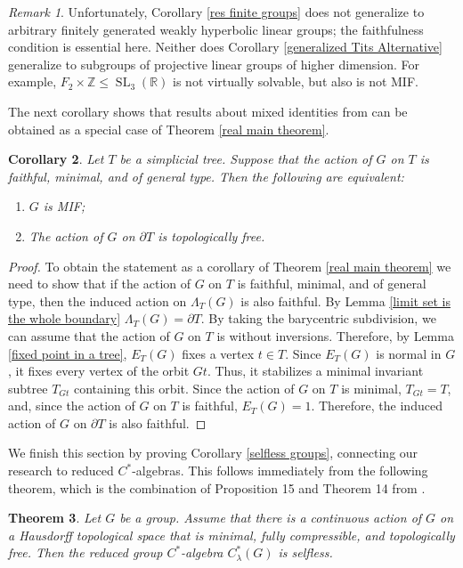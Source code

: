 \documentclass[11pt,letterpaper]{article}
\newcommand{\ZZ}{\mathbb{Z}}
\newcommand{\RR}{\mathbb{R}}
\DeclareMathOperator{\SL}{SL}
\newtheorem{thm}{Theorem}[section]
\newtheorem{cor}[thm]{Corollary}
\theoremstyle{definition}
\theoremstyle{remark}
\newtheorem{rem}[thm]{Remark}
\begin{document}
\begin{rem}
Unfortunately, Corollary \ref{res finite groups} does not generalize to arbitrary finitely generated weakly hyperbolic linear groups; the faithfulness condition is essential here. Neither does Corollary \ref{generalized Tits Alternative} generalize to subgroups of projective linear groups of higher dimension. For example, $F_2 \times \ZZ \leq \SL_3(\RR)$ is not virtually solvable, but also is not MIF. 
\end{rem}

The next corollary shows that results about mixed identities from \cite{FMMS} can be obtained as a special case of Theorem \ref{real main theorem}.

\begin{cor}\cite[Theorem B]{FMMS}\label{previous results about MIF in trees}
Let $T$ be a simplicial tree. Suppose that the action of $G$ on $T$ is faithful, minimal, and of general type. Then the following are equivalent:
\begin{enumerate}
\item $G$ is MIF;
\item The action of $G$ on $\partial T$ is topologically free.
\end{enumerate} 
\end{cor}
\begin{proof}
To obtain the statement as a corollary of Theorem \ref{real main theorem} we need to show that if the action of $G$ on $T$ is faithful, minimal, and of general type, then the induced action on $\Lambda_T(G)$ is also faithful.
By Lemma \ref{limit set is the whole boundary} $\Lambda_T(G) = \partial T$. By taking the barycentric subdivision, we can assume that the action of $G$ on $T$ is without inversions. Therefore, by Lemma \ref{fixed point in a tree}, $E_T(G)$ fixes a vertex $t \in T$. Since $E_T(G)$ is normal in $G$, it fixes every vertex of the orbit $Gt$. Thus, it stabilizes a minimal invariant subtree $T_{Gt}$ containing this orbit. Since the action of $G$ on $T$ is minimal, $T_{Gt}=T$, and, since the action of $G$ on $T$ is faithful, $E_T(G)=1$. Therefore, the induced action of $G$ on $\partial T$ is also faithful. 
\end{proof}

We finish this section by proving Corollary \ref{selfless groups}, connecting our research to reduced $C^*$-algebras. This follows immediately from the following theorem, which is the combination of Proposition 15 and Theorem 14 from \cite{Oza}.

 \begin{thm}\label{Ozawa}
 Let $G$ be a group. Assume that there is a continuous action of $G$ on a Hausdorff topological space that is minimal, fully compressible, and topologically free.
 Then the reduced group $C^*$-algebra $C_\lambda^*(G)$ is selfless. 
 \end{thm}
\end{document}
